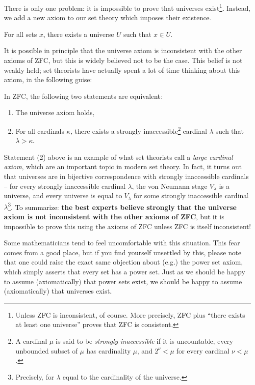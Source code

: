 There is only one problem: it is impossible to prove that universes exist\footnote{Unless ZFC is inconsistent, of course. More precisely, ZFC plus ``there exists at least one universe'' proves that ZFC is consistent.}. Instead, we add a new axiom to our set theory which imposes their existence.

\begin{axiom}\label{ax:universes}
    For all sets $x$, there exists a universe $U$ such that $x \in U$.
\end{axiom}

It is possible in principle that the universe axiom is inconsistent with the other axioms of ZFC, but this is widely believed not to be the case. This belief is not weakly held; set theorists have actually spent a lot of time thinking about this axiom, in the following guise:

\begin{proposition}\label{prop:appendix:size issues:universes and inaccessible cardinals}
    In ZFC, the following two statements are equivalent:
    \begin{enumerate}
        \item The universe axiom holds,
        \item For all cardinals $\kappa$, there exists a strongly inaccessible\footnote{A cardinal $\mu$ is said to be \emph{strongly inaccessible} if it is uncountable, every unbounded subset of $\mu$ has cardinality $\mu$, and $2^\nu < \mu$ for every cardinal $\nu < \mu$.} cardinal $\lambda$ such that $\lambda > \kappa$.
    \end{enumerate}
\end{proposition}

Statement (2) above is an example of what set theorists call a \emph{large cardinal axiom}, which are an important topic in modern set theory. In fact, it turns out that universes are in bijective correspondence with strongly inaccessible cardinals -- for every strongly inaccessible cardinal $\lambda$, the von Neumann stage $V_\lambda$ is a universe, and every universe is equal to $V_\lambda$ for some strongly inaccessible cardinal $\lambda$\footnote{Precisely, for $\lambda$ equal to the cardinality of the universe.}. To summarize: \textbf{the best experts believe strongly that the universe axiom is not inconsistent with the other axioms of ZFC}, but it is impossible to prove this using the axioms of ZFC unless ZFC is itself inconsistent!

Some mathematicians tend to feel uncomfortable with this situation. This fear comes from a good place, but if you find yourself unsettled by this, please note that one could raise the exact same objection about (e.g.) the power set axiom, which simply asserts that every set has a power set. Just as we should be happy to assume (axiomatically) that power sets exist, we should be happy to assume (axiomatically) that universes exist.


